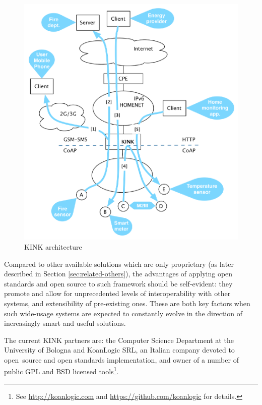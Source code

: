 \documentclass[12pt]{article}
\begin{document}
\begin{center}
    \begin{figure}
        \includegraphics[width=14cm]{../share/images/kink-homenet}
            \caption{KINK architecture}
            \label{fig:arch}
    \end{figure}
\end{center}

Compared to other available solutions which are only proprietary (as later described in Section \ref{sec:related-others}), the advantages of applying open standards and open source to such framework should be self-evident: they promote and allow for unprecedented levels of interoperability with other systems, and extensibility of pre-existing ones. These are both key factors when such wide-usage systems are expected to constantly evolve in the direction of increasingly smart and useful solutions.

The current KINK partners are: the Computer Science Department at the University of Bologna and KoanLogic SRL, an Italian company devoted to \mbox{open source} and open standards implementation, and owner of a number of public GPL and BSD licensed tools\footnote{See \href{http://koanlogic.com}{http://koanlogic.com} and \href{https://github.com/koanlogic}{https://github.com/koanlogic} for details.}.
\end{document}
